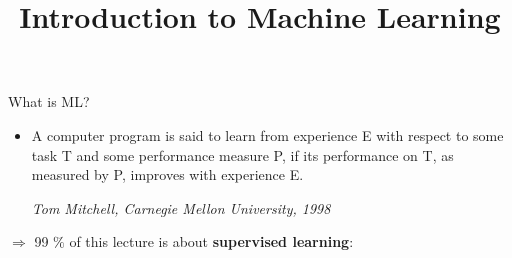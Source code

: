 \documentclass[11pt,compress,t,notes=noshow, xcolor=table]{beamer}
\title{Introduction to Machine Learning}
\date{}
\begin{document}
\sloppy


\begin{vbframe}{What is ML?}
\begin{itemize}
    \item \small A computer program is said to learn from experience E with respect to
  some task T and some performance measure P, if its performance on T, as 
  measured by P, improves with experience E. \\
  \begin{footnotesize}
  \emph{Tom Mitchell, Carnegie Mellon University, 1998}
  \end{footnotesize}
\end{itemize}


\small $\Rightarrow$ 99 $\%$ of this lecture is about \textbf{supervised learning}: 


\end{vbframe}
\end{document}
